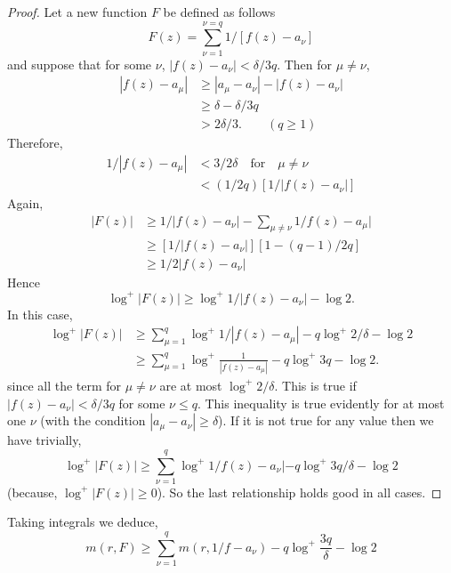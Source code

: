 \begin{proof}
Let a new function $F$ be defined as follows
$$
F(z)=\sum^{\nu=q}_{\nu=1}1/[f(z)-a_{\nu}]
$$
and suppose that for some $\nu$, $|f(z)-a_{\nu}|<\delta/3q$. Then for
$\mu\neq \nu$,
\begin{align*}
|f(z)-a_{\mu}| &\geq |a_{\mu}-a_{\nu}|-|f(z)-a_{\nu}|\\
&\geq \delta-\delta/3q\\
&> 2\delta/3.\qquad (q\geq 1)
\end{align*}
Therefore,
\begin{align*}
1/|f(z)-a_{\mu}| &< 3/2\delta\quad\text{for}\quad \mu\neq \nu\\
&< (1/2q)[1/|f(z)-a_{\nu}|] 
\end{align*}
Again,\pageoriginale
\begin{align*}
|F(z)| &\geq 1/|f(z)-a_{\nu}|-\sum_{\mu\neq \nu}1/f(z)-a_{\mu}|\\
&\geq [1/|f(z)-a_{\nu}|][1-(q-1)/2q]\\
&\geq 1/2|f(z)-a_{\nu}|
\end{align*}
Hence
$$
\log^{+}|F(z)|\geq \log^{+} 1/|f(z)-a_{\nu}|-\log  2.
$$
In this case,
\begin{align*}
\log^{+}|F(z)| &\geq
\sum^{q}_{\mu=1}\log^{+}1/|f(z)-a_{\mu}|-q\log^{+}2/\delta-\log 2\\
&\geq
\sum^{q}_{\mu=1}\log^{+}\frac{1}{|f(z)-a_{\mu}|}-q\log^{+}3q-\log 2.
\end{align*}
since all the term for $\mu\neq \nu$ are at most
$\log^{+}2/\delta$. This is true if $|f(z)-a_{\nu}|<\delta /3q$ for
some $\nu\leq q$. This inequality is true evidently for at most one
$\nu$ (with the condition $|a_{\mu}-a_{\nu}|\geq \delta$). If it is
not true for any value then we have trivially,
$$
\log^{+}|F(z)|\geq
\sum^{q}_{\nu=1}\log^{+}1/f(z)-a_{\nu}|-q\log^{+}3q/\delta-\log 2
$$
(because, $\log^{+}|F(z)|\geq 0$). So the last relationship holds good
in all cases. 
\end{proof}

Taking integrals we deduce,
\begin{equation*}
m(r,F)\geq
\sum^{q}_{\nu=1}m(r,1/f-a_{\nu})-q\log^{+}\frac{3q}{\delta}-\log 2
\tag{2.1}\label{part2-eq2.1} 
\end{equation*}

